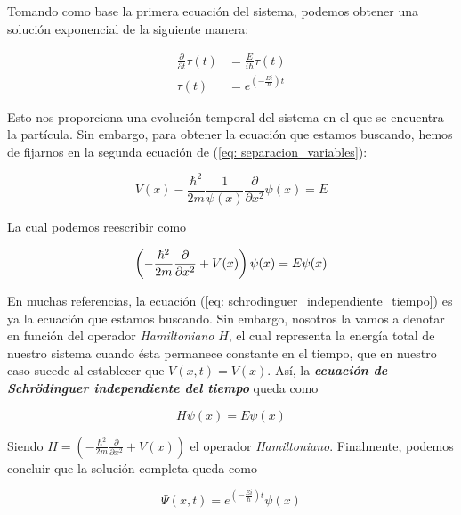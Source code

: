 \documentclass{article}
\numberwithin{equation}{section} %
\begin{document}
    Tomando como base la primera ecuación del sistema, podemos obtener una solución exponencial de la siguiente manera:
        
    \begin{align*}
        \frac{\partial}{\partial t} \tau(t) &= \frac{E}{i \hbar} \tau(t) \\[10pt]
        \tau(t) &= e ^ { \left( - \frac{Ei}{\hbar} \right) t}
    \end{align*}

    Esto nos proporciona una evolución temporal del sistema en el que se encuentra la partícula. Sin embargo, para obtener la ecuación que estamos buscando, hemos de fijarnos en la segunda ecuación de (\ref{eq: separacion_variables}):

    \begin{equation*}
        V(x) - \frac{\hbar^{2}}{2m} \frac{1}{\psi(x)} \frac{\partial}{\partial x^{2}} \psi(x) = E
    \end{equation*}

    La cual podemos reescribir como

    \begin{equation}
        \left( - \frac{\hbar^{2}}{2m} \frac{\partial}{\partial x^{2}} + V(x) \right) \psi(x) = E \psi(x) \\[5pt]
        \label{eq: schrodinguer_independiente_tiempo}
    \end{equation}

    En muchas referencias, la ecuación (\ref{eq: schrodinguer_independiente_tiempo}) es ya la ecuación que estamos buscando. Sin embargo, nosotros la vamos a denotar en función del operador \textit{Hamiltoniano} \( H \), el cual representa la energía total de nuestro sistema cuando ésta permanece constante en el tiempo, que en nuestro caso sucede al establecer que \( V(x, t) = V(x) \). Así, la \textbf{\textit{ecuación de Schrödinguer independiente del tiempo}} queda como
    
    \begin{equation}
        \boxed{ H \psi(x) = E \psi(x)}
        \label{eq: schrodinguer_independiente_tiempo_hamiltoniano}
    \end{equation}

    Siendo \( H = \left( - \frac{\hbar^{2}}{2m} \frac{\partial}{\partial x^{2}} + V(x) \right) \) el operador \textit{Hamiltoniano}. Finalmente, podemos concluir que la solución completa queda como

    \begin{equation}
        \Psi(x, t) = e ^ { \left( - \frac{Ei}{\hbar} \right) t} \psi(x)
    \end{equation}
\end{document}
